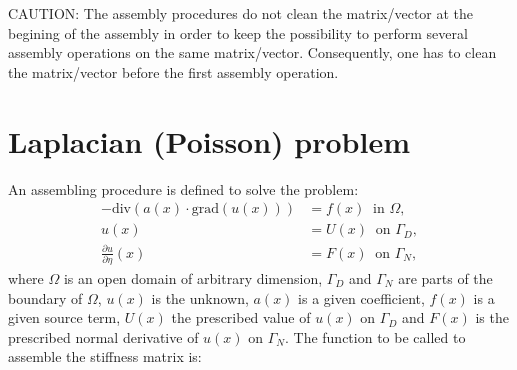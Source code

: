 \documentclass[a4paper,11pt,english]{sphinxmanual}
\begin{document}
CAUTION: The assembly procedures do not clean the matrix/vector at the begining of the assembly in order to keep the possibility to perform several assembly operations on the same matrix/vector. Consequently, one has to clean the matrix/vector before the first assembly operation.


\section{Laplacian (Poisson) problem}
\label{\detokenize{userdoc/asm:laplacian-poisson-problem}}
An assembling procedure is defined to solve the problem:
\begin{equation*}
\begin{split}-\mbox{div}(a(x)\cdot\mbox{grad}(u(x))) &= f(x)\ \mbox{ in }\Omega,  \\
u(x) & = U(x)\ \mbox{ on }\Gamma_D, \\
\frac{\partial u}{\partial\eta}(x) & = F(x)\ \mbox{ on }\Gamma_N,\end{split}
\end{equation*}
where \(\Omega\) is an open domain of arbitrary dimension, \(\Gamma_{D}\)
and \(\Gamma_{N}\) are parts of the boundary of \(\Omega\), \(u(x)\)
is the unknown, \(a(x)\) is a given coefficient, \(f(x)\) is a given
source term, \(U(x)\) the prescribed value of \(u(x)\) on
\(\Gamma_{D}\) and \(F(x)\) is the prescribed normal derivative of
\(u(x)\) on \(\Gamma_{N}\). The function to be called to assemble the
stiffness matrix is:

\begin{sphinxVerbatim}[commandchars=\\\{\}]
    
\end{sphinxVerbatim}
\end{document}
